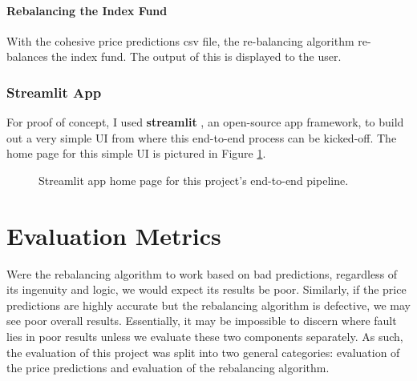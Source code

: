 \documentclass[10pt,twocolumn]{article}
\begin{document}
\paragraph{Rebalancing the Index Fund}

With the cohesive price predictions csv file, the re-balancing algorithm re-balances the index fund. The output of this is displayed to the user.

\subsubsection{Streamlit App}

For proof of concept, I used \textbf{streamlit} \cite{streamlit}, an open-source app framework, to build out a very simple UI from where this end-to-end process can be kicked-off. The home page for this simple UI is pictured in Figure \ref{streamlitapp}.

\begin{figure}
    \centering
    \caption{
        Streamlit app home page for this project's end-to-end pipeline.
    }
    \label{streamlitapp}
\end{figure}


\section{Evaluation Metrics} \label{evaluationmetrics}

Were the rebalancing algorithm to work based on bad predictions, regardless of its ingenuity and logic, we would expect its results be poor. Similarly, if the price predictions are highly accurate but the rebalancing algorithm is defective, we may see poor overall results. Essentially, it may be impossible to discern where fault lies in poor results unless we evaluate these two components separately. As such, the evaluation of this project was split into two general categories: evaluation of the price predictions and evaluation of the rebalancing algorithm.
\end{document}
